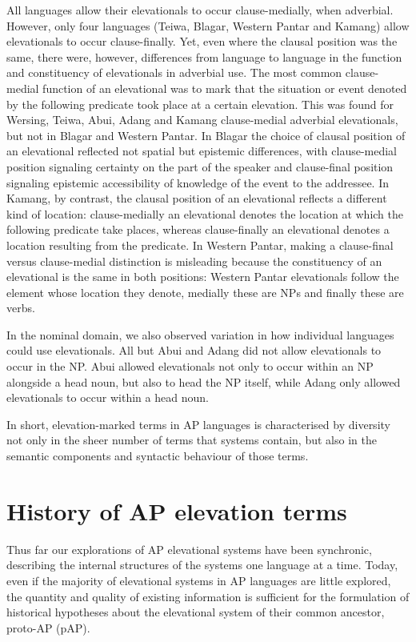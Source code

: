 \documentclass[output=paper]{LSP/langsci}
\begin{document}
All languages allow their elevationals to occur clause-medially, when adverbial. However, only four languages (Teiwa, Blagar, Western Pantar and Kamang) allow elevationals to occur clause-finally. Yet, even where the clausal position was the same, there were, however, differences from language to language in the function and constituency of elevationals in adverbial use. The most common clause-medial function of an elevational was to mark that the situation or event denoted by the following predicate took place at a certain elevation. This was found for Wersing, Teiwa, Abui, Adang and Kamang clause-medial adverbial elevationals, but not in Blagar and Western Pantar. In Blagar the choice of clausal position of an elevational reflected not spatial but epistemic differences, with clause-medial position signaling certainty on the part of the speaker and clause-final position signaling epistemic accessibility of knowledge of the event to the addressee. In Kamang, by contrast, the clausal position of an elevational reflects a different kind of location: clause-medially an elevational denotes the location at which the following predicate take places, whereas clause-finally an elevational denotes a location resulting from the predicate. In Western Pantar, making a clause-final versus clause{}-medial distinction is misleading because the constituency of an elevational is the same in both positions: Western Pantar elevationals follow the element whose location they denote, medially these are NPs and finally these are verbs. 

In the nominal domain, we also observed variation in how individual languages could use elevationals. All but Abui and Adang did not allow elevationals to occur in the NP. Abui allowed elevationals not only to occur within an NP alongside a head noun, but also to head the NP itself, while Adang only allowed elevationals to occur within a head noun.

In short, elevation-marked terms in AP languages is characterised by diversity not only in the sheer number of terms that systems contain, but also in the semantic components and syntactic behaviour of those terms. 

\section{History of AP elevation terms}\label{sec:7:4}
Thus far our explorations of AP elevational systems have been synchronic, describing the internal structures of the systems one language at a time. Today, even if the majority of elevational systems in AP languages are little explored, the quantity and quality of existing information is sufficient for the formulation of historical hypotheses about the elevational system of their common ancestor, proto-AP (pAP).
\end{document}
